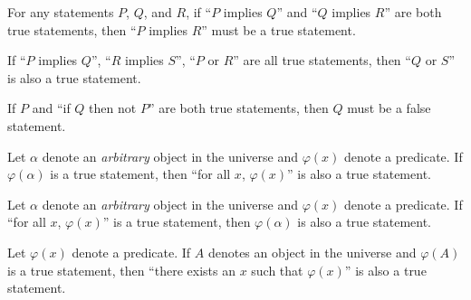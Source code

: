 \begin{meta-rule}
     \label{meta-rule:hypothetical-syllogism}
    For any statements \( P \), \( Q \), and \( R \), if ``\( P \) implies \( Q \)'' and ``\( Q \) implies \( R \)'' are both true statements, then
    ``\( P \) implies \( R \)'' must be a true statement.
\end{meta-rule}

\begin{meta-rule}
     \label{meta-rule:constructive-dilemma}
    If ``\( P \) implies \( Q \)'', ``\( R \) implies \( S \)'', ``\( P \) or \( R \)'' are all true statements, then ``\( Q \) or \( S \)'' is also
    a true statement.
\end{meta-rule}

\begin{meta-rule}
     \label{meta-rule:reductio-ad-absurdum}
    If \( P \) and ``if \( Q \) then not \( P \)'' are both true statements, then \( Q \) must be a false statement.
\end{meta-rule}

\begin{meta-rule}
     \label{meta-rule:universal-generalization}
    Let \( \alpha \) denote an \emph{arbitrary} object in the universe and \( \varphi(x) \) denote a predicate.
    If \( \varphi(\alpha) \) is a true statement, then ``for all \( x \), \( \varphi(x) \)'' is also a true statement.
\end{meta-rule}

\begin{meta-rule}
     \label{meta-rule:universal-instantiation}
    Let \( \alpha \) denote an \emph{arbitrary} object in the universe and \( \varphi(x) \) denote a predicate.
    If ``for all \( x \), \( \varphi(x) \)'' is a true statement, then \( \varphi(\alpha) \) is also a true statement.
\end{meta-rule}

\begin{meta-rule}
     \label{meta-rule:existential-generalization}
    Let \( \varphi(x) \) denote a predicate. If \( A \) denotes an object in the universe and \( \varphi(A) \) is a true statement,
    then ``there exists an \( x \) such that \( \varphi(x) \)'' is also a true statement.
\end{meta-rule}

